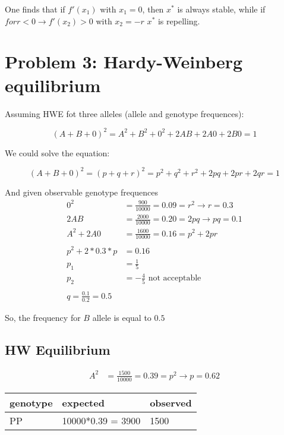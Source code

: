 One finds that if $ f'(x_1) $ with $x_1 = 0$, then $x^{\ast}$ is always stable, while if $ for r < 0 \rightarrow f'(x_2) > 0 $ with $x_2 = -r $ $x^{\ast}$ is repelling.



\setcounter{chapter}{3}
\setcounter{section}{0}
\section{Problem 3: Hardy-Weinberg equilibrium}
Assuming HWE fot three alleles (allele and genotype frequences):

\[  (A+B+0)^2 = A^2 + B^2 + 0^2 + 2AB + 2A0 + 2B0 = 1  \]

We could solve the equation: 

\[  (A+B+0)^2 = (p+q+r)^2 = p^2 + q^2 + r^2 + 2pq + 2pr + 2qr = 1  \]

And given observable genotype frequences
\begin{align}
0^2 &= \frac{900}{10000} = 0.09 = r^2 \rightarrow r = 0.3 \\
2AB &= \frac{2000}{10000} = 0.20 = 2pq \rightarrow pq = 0.1 \\
A^2 + 2A0 &= \frac{1600}{10000} = 0.16 = p^2 + 2pr\\
\\
p^2+2*0.3*p &= 0.16 \\
p_1 &= \frac{1}{5} \\
p_2 &= -\frac{4}{5} \text{~not acceptable}\\
\\
q = \frac{0.1}{0.2} = 0.5
\end{align}

So, the frequency for $B$ allele is equal to $0.5$

\subsection{HW Equilibrium}

\begin{align}
A^2 &= \frac{1500}{10000} = 0.39 = p^2 \rightarrow p = 0.62 
\end{align}
\begin{center}
\begin{tabular}{|l|l|l|}
\hline genotype & expected & observed \\ 
\hline PP & 10000*0.39 = 3900 & 1500 \\ 
\hline 
\end{tabular} 
\end{center}

